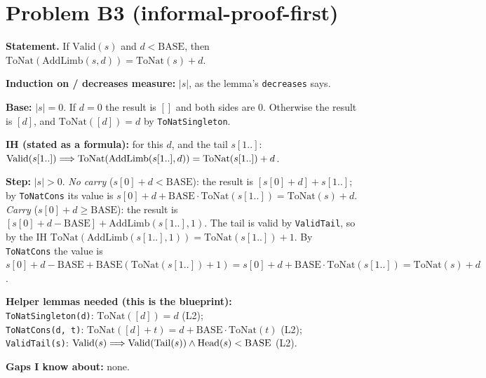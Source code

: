\documentclass[11pt]{article}
\begin{document}
\section*{Problem B3 (informal-proof-first)}\label{ans:B3}
\begin{answer}
\textbf{Statement.} If $\mathrm{Valid}(s)$ and $d < \mathrm{BASE}$, then
$\mathrm{ToNat}(\mathrm{AddLimb}(s, d)) = \mathrm{ToNat}(s) + d$.

\textbf{Induction on / decreases measure:} $|s|$, as the lemma's
\texttt{decreases} says.

\textbf{Base:} $|s| = 0$. If $d = 0$ the result is $[]$ and both sides are
$0$. Otherwise the result is $[d]$, and $\mathrm{ToNat}([d]) = d$ by
\texttt{ToNatSingleton}.

\textbf{IH (stated as a formula):} for this $d$, and the tail $s[1..]$:
$\mathrm{Valid}(s[1..]) \Longrightarrow \mathrm{ToNat}(\mathrm{AddLimb}(s[1..], d)) = \mathrm{ToNat}(s[1..]) + d$.

\textbf{Step:} $|s| > 0$.
\emph{No carry} ($s[0] + d < \mathrm{BASE}$): the result is
$[s[0] + d] + s[1..]$; by \texttt{ToNatCons} its value is
$s[0] + d + \mathrm{BASE}\cdot\mathrm{ToNat}(s[1..]) = \mathrm{ToNat}(s) + d$.
\emph{Carry} ($s[0] + d \geq \mathrm{BASE}$): the result is
$[s[0] + d - \mathrm{BASE}] + \mathrm{AddLimb}(s[1..], 1)$. The tail is valid
by \texttt{ValidTail}, so by the IH
$\mathrm{ToNat}(\mathrm{AddLimb}(s[1..], 1)) = \mathrm{ToNat}(s[1..]) + 1$.
By \texttt{ToNatCons} the value is
$s[0] + d - \mathrm{BASE} + \mathrm{BASE}(\mathrm{ToNat}(s[1..]) + 1)
= s[0] + d + \mathrm{BASE}\cdot\mathrm{ToNat}(s[1..]) = \mathrm{ToNat}(s) + d$.

\textbf{Helper lemmas needed (this is the blueprint):} \\
\texttt{ToNatSingleton(d)}: $\mathrm{ToNat}([d]) = d$ (L2); \\
\texttt{ToNatCons(d, t)}: $\mathrm{ToNat}([d] + t) = d + \mathrm{BASE}\cdot\mathrm{ToNat}(t)$ (L2); \\
\texttt{ValidTail(s)}: $\mathrm{Valid}(s) \Longrightarrow \mathrm{Valid}(\mathrm{Tail}(s)) \wedge \mathrm{Head}(s) < \mathrm{BASE}$ (L2).

\textbf{Gaps I know about:} none.
\end{answer}

\end{document}
